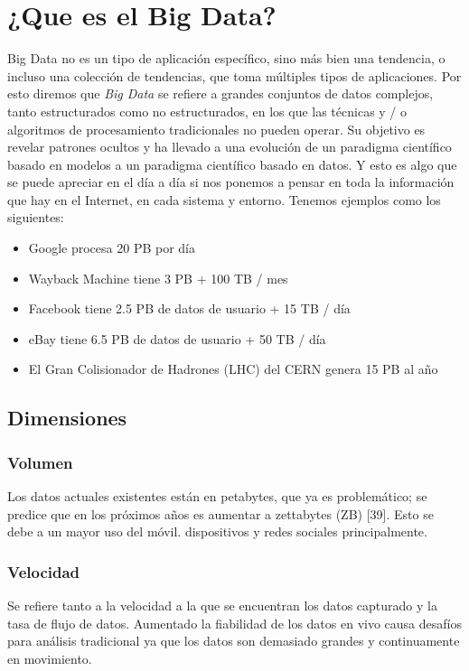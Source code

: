 \section{¿Que es el Big Data?}
Big Data no es un tipo de aplicación específico, sino más bien una tendencia, o incluso una colección de tendencias, que toma múltiples tipos de aplicaciones. Por esto diremos que \textit{Big Data} se refiere a grandes conjuntos de datos complejos, tanto estructurados como no estructurados, en los que las técnicas y / o algoritmos de procesamiento tradicionales no pueden operar. Su objetivo es revelar patrones ocultos y ha llevado a una evolución de un paradigma científico basado en modelos a un paradigma científico basado en datos. Y esto es algo que se puede apreciar en el día a día si nos ponemos a pensar en toda la información que hay en el Internet, en cada sistema y entorno. Tenemos ejemplos como los siguientes:

\begin{itemize}
\item Google procesa 20 PB por día
\item Wayback Machine tiene 3 PB + 100 TB / mes 
\item Facebook tiene 2.5 PB de datos de usuario + 15 TB / día 
\item eBay tiene 6.5 PB de datos de usuario + 50 TB / día 
\item El Gran Colisionador de Hadrones (LHC) del CERN genera 15 PB al año
\end{itemize}

\subsection{Dimensiones}
\subsubsection{Volumen}
Los datos actuales existentes están en petabytes,
que ya es problemático; se predice que en
los próximos años es aumentar a zettabytes
(ZB) [39]. Esto se debe a un mayor uso del móvil.
dispositivos y redes sociales principalmente.

\subsubsection{Velocidad}  
Se refiere tanto a la velocidad a la que se encuentran los datos
capturado y la tasa de flujo de datos. Aumentado
la fiabilidad de los datos en vivo causa desafíos para
análisis tradicional ya que los datos son demasiado grandes y
continuamente en movimiento.
